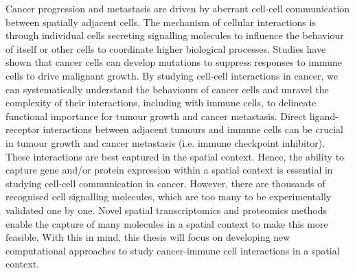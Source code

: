 

%

%





\noindent
Cancer progression and metastasis are driven by aberrant cell-cell communication between spatially adjacent cells. The mechanism of cellular interactions is through individual cells secreting signalling molecules to influence the behaviour of itself or other cells to coordinate higher biological processes. Studies have shown that cancer cells can develop mutations to suppress responses to immune cells to drive malignant growth. By studying cell-cell interactions in cancer, we can systematically understand the behaviours of cancer cells and unravel the complexity of their interactions, including with immune cells, to delineate functional importance for tumour growth and cancer metastasis. Direct ligand-receptor interactions between adjacent tumours and immune cells can be crucial in tumour growth and cancer metastasis (i.e. immune checkpoint inhibitor). These interactions are best captured in the spatial context. Hence, the ability to capture gene and/or protein expression within a spatial context is essential in studying cell-cell communication in cancer. However, there are thousands of recognised cell signalling molecules, which are too many to be experimentally validated one by one. Novel spatial transcriptomics and proteomics methods enable the capture of many molecules in a spatial context to make this more feasible. With this in mind, this thesis will focus on developing new computational approaches to study cancer-immune cell interactions in a spatial context.

